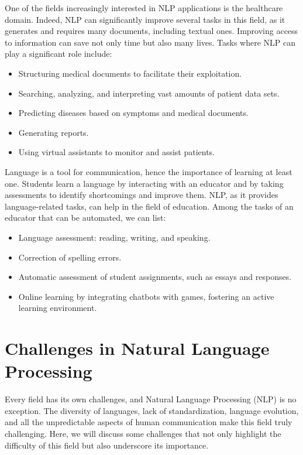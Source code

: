 \documentclass{KBook}
\begin{document}
One of the fields increasingly interested in NLP applications is the healthcare domain. Indeed, NLP can significantly improve several tasks in this field, as it generates and requires many documents, including textual ones. Improving access to information can save not only time but also many lives. Tasks where NLP can play a significant role include:

\begin{itemize}
	\item Structuring medical documents to facilitate their exploitation.
	\item Searching, analyzing, and interpreting vast amounts of patient data sets.
	\item Predicting diseases based on symptoms and medical documents.
	\item Generating reports.
	\item Using virtual assistants to monitor and assist patients.
\end{itemize}

Language is a tool for communication, hence the importance of learning at least one. Students learn a language by interacting with an educator and by taking assessments to identify shortcomings and improve them. NLP, as it provides language-related tasks, can help in the field of education. Among the tasks of an educator that can be automated, we can list:

\begin{itemize}
	\item Language assessment: reading, writing, and speaking.
	\item Correction of spelling errors.
	\item Automatic assessment of student assignments, such as essays and responses.
	\item Online learning by integrating chatbots with games, fostering an active learning environment.
\end{itemize}


\section{Challenges in Natural Language Processing}

Every field has its own challenges, and Natural Language Processing (NLP) is no exception. The diversity of languages, lack of standardization, language evolution, and all the unpredictable aspects of human communication make this field truly challenging. Here, we will discuss some challenges that not only highlight the difficulty of this field but also underscore its importance.
\end{document}
